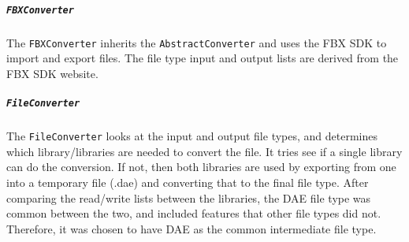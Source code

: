     \subparagraph{\texttt{FBXConverter}}
    \hfill \break
    The \texttt{FBXConverter} inherits the \texttt{AbstractConverter} and uses the FBX SDK to import and export files.
    The file type input and output lists are derived from the FBX SDK website.

    \subparagraph{\texttt{FileConverter}}
    \hfill \break
    The \texttt{FileConverter} looks at the input and output file types, and determines which library/libraries are needed to convert the file.
    It tries see if a single library can do the conversion.  If not, then both libraries are used by exporting from one into a 
    temporary file (.dae) and converting that to the final file type. After comparing the read/write lists between the libraries,
    the DAE file type was common between the two, and included features that other file types did not.  Therefore, it was chosen
    to have DAE as the common intermediate file type.

